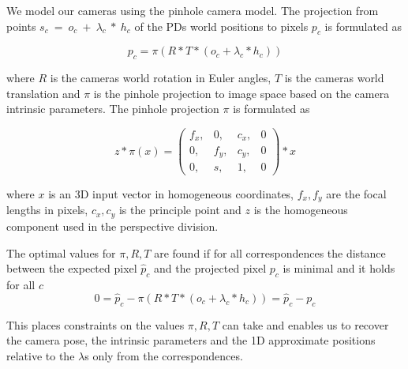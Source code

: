 We model our cameras using the pinhole camera model. 
The projection from points $s_c~=~o_c~+~\lambda_c~*~h_c$ of the PDs world positions to pixels $p_c$ is formulated as

\begin{equation}
  \label{eq:static_calibration_reprojection}
  p_c = \pi \left( R * T * (o_c + \lambda_c * h_c) \right)
\end{equation}

where $R$ is the cameras world rotation in Euler angles, $T$ is the cameras world translation and $\pi$ is the pinhole projection to image space based on the camera intrinsic parameters.
The pinhole projection $\pi$ is formulated as

\begin{equation}
  \label{eq:static_calibration_intrinsic_parameters}
  z * \pi(x) =   
  \begin{pmatrix}
    f_x,& 0,& c_x,& 0\\
    0,& f_y,& c_y,& 0\\
    0,& s,& 1 ,& 0
  \end{pmatrix} * x 
\end{equation}

where $x$ is an 3D input vector in homogeneous coordinates, $f_x, f_y$ are the focal lengths in pixels, $c_x, c_y$ is the principle point and $z$ is the homogeneous component used in the perspective division. 

The optimal values for $\pi,R,T$ are found if for all correspondences the distance between the expected pixel $\hat{p}_c$ and the projected pixel $p_c$ is minimal and it holds for all $c$
\begin{equation}
  0 = \hat{p}_c - \pi \left( R * T * (o_c + \lambda_c * h_c)\right) = \hat{p}_c - p_c
\end{equation}

This places constraints on the values $\pi,R,T$ can take and enables us to recover the camera pose, the intrinsic parameters and the 1D approximate positions relative to the $\lambda$s only from the correspondences.


